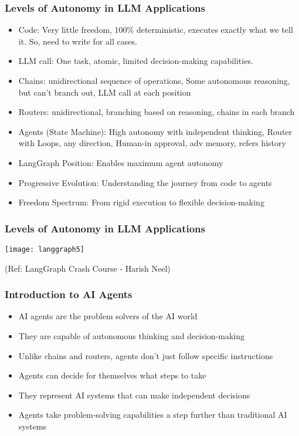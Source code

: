 \begin{frame}[fragile]\frametitle{Levels of Autonomy in LLM Applications}
      \begin{itemize}
        \item Code: Very little freedom, 100\% deterministic, executes exactly what we tell it. So, need to write for all cases.
        \item LLM call: One task, atomic, limited decision-making capabilities.
        \item Chains: unidirectional sequence of operations, Some autonomous reasoning, but can't branch out, LLM call at each position
		\item Routers: unidirectional, branching based on reasoning, chains in each branch
        \item Agents (State Machine): High autonomy with independent thinking, Router with Loops, any direction, Human-in approval, adv memory, refers history
        \item LangGraph Position: Enables maximum agent autonomy
        \item Progressive Evolution: Understanding the journey from code to agents
        \item Freedom Spectrum: From rigid execution to flexible decision-making
      \end{itemize}
\end{frame}


\begin{frame}[fragile]\frametitle{Levels of Autonomy in LLM Applications}

\begin{center}
\texttt{[image: langgraph5]}

{\tiny (Ref: LangGraph Crash Course - Harish Neel)}

\end{center}	  


\end{frame}


\begin{frame}[fragile]\frametitle{Introduction to AI Agents}
      \begin{itemize}
        \item AI agents are the problem solvers of the AI world
        \item They are capable of autonomous thinking and decision-making
        \item Unlike chains and routers, agents don't just follow specific instructions
        \item Agents can decide for themselves what steps to take
        \item They represent AI systems that can make independent decisions
        \item Agents take problem-solving capabilities a step further than traditional AI systems
      \end{itemize}
\end{frame}

